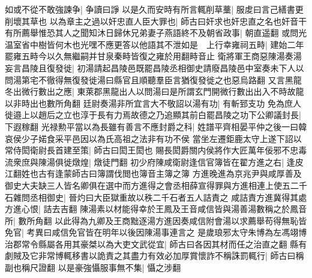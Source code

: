 如或不從不敢強諫争|{
	争讀曰諍}
以是久而安時有所言輒削草藳|{
	服䖍曰言己繕書更削壞其草也}
以為章主之過以奸忠直人臣大罪也|{
	師古曰奸求也奸忠直之名也奸音干}
有所薦舉惟恐其人之聞知沐日歸休兄弟妻子燕語終不及朝省政事|{
	朝直遥翻}
或問光温室省中樹皆何木也光嘿不應更答以他語其不泄如是　上行幸雍祠五畤|{
	建始二年罷雍五畤今以久無繼嗣并甘泉秦畤皆復之雍於用翻畤音止}
衛將軍王商惡陳湯奏湯妄言昌陵且復發徙|{
	初湯請起昌陵邑既罷昌陵丞相御史請廢昌陵邑中室奏未下人以問湯第宅不徹得無復發徙湯曰縣官且順聽羣臣言猶復發徙之也惡烏路翻}
又言黑龍冬出微行數出之應|{
	東萊郡黑龍出人以問湯曰是所謂玄門開微行數出出入不時故龍以非時出也數所角翻}
廷尉奏湯非所宜言大不敬詔以湯有功|{
	有斬郅支功}
免為庶人徙邉上以趙后之立也淳于長有力焉故德之乃追顯其前白罷昌陵之功下公卿議封長|{
	下遐稼翻}
光禄勲平當以為長雖有善言不應封爵之科|{
	姓譜平齊相晏平仲之後一曰韓哀侯少子婼食采平邑因以為氏高祖之法非有功不侯}
當坐左遷鉅鹿太守上遂下詔以常侍閎衛尉長首建至策|{
	師古曰閎王閎也}
賜長閎爵關内侯將作大匠萬年佞邪不忠毒流衆庶與陳湯俱徙燉煌|{
	燉徒門翻}
初少府陳咸衛尉逢信官簿皆在翟方進之右|{
	逢皮江翻姓也古有逢蒙師古曰簿謂伐閲也簿音主簿之簿}
方進晚進為京兆尹與咸厚善及御史大夫缺三人皆名卿俱在選中而方進得之會丞相薛宣得罪與方進相連上使五二千石雜問丞相御史|{
	晉灼曰大臣獄重故以秩二千石者五人詰責之}
咸詰責方進冀得其處方進心恨|{
	詰去吉翻}
陳湯素以材能得幸於王鳳及王音咸信皆與湯善湯數稱之於鳳音所|{
	數所角翻}
以此得為九卿及王商黜逐湯方進因奏咸信附會湯以求薦舉苟得無恥皆免官|{
	考異曰咸信免官皆在明年以後因陳湯事連言之}
是歲琅邪太守朱博為左馮翊博治郡常令縣屬各用其豪桀以為大吏文武從宜|{
	師古曰各因其材而任之治直之翻}
縣有劇賊及它非常博輒移書以詭責之其盡力有效必加厚賞懷詐不稱誅罰輒行|{
	師古曰稱副也稱尺證翻}
以是豪強懾服事無不集|{
	懾之涉翻}


